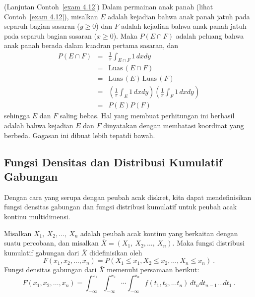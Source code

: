 \begin{example}(Lanjutan Contoh~\ref{exam 4.12}){\label{exam 4.15}}
Dalam permainan anak panah (lihat Contoh~\ref{exam 4.12}), misalkan $E$ adalah kejadian bahwa
anak panah jatuh pada separuh bagian  sasaran ($y \geq 0$) dan $F$ adalah
kejadian bahwa anak panah jatuh pada separuh bagian  sasaran ($x \geq
0$).  Maka $P(E \cap F)$ adalah peluang bahwa anak panah berada dalam kuadran pertama
sasaran, dan
\begin{eqnarray*}
P(E \cap F) & = & \frac 1\pi \int_{E \cap F} 1\,dxdy \\
            & = & \mbox{Luas}\,(E\cap F)         \\
            & = & \mbox{Luas}\,(E)\,\mbox{Luas}\,(F)  \\
            & = & \left(\frac 1\pi \int_E 1\,dxdy\right) \left(\frac 1\pi \int_F
1\,dxdy\right) \\
            & = & P(E)P(F)
\end{eqnarray*}
sehingga $E$ dan $F$ saling bebas.  Hal yang membuat perhitungan ini berhasil adalah bahwa kejadian
$E$ dan $F$ dinyatakan dengan membatasi koordinat yang berbeda.  Gagasan ini dibuat 
lebih tepat\linebreak[4] di bawah.
\end{example}

\subsection*{Fungsi Densitas dan Distribusi Kumulatif Gabungan}

Dengan cara yang serupa dengan peubah acak diskret, kita dapat mendefinisikan fungsi densitas
gabungan dan fungsi distribusi kumulatif untuk peubah acak kontinu multidimensi.  

\begin{definition}\label{def 4.5}
Misalkan $X_1,~X_2, \ldots,~X_n$ adalah peubah acak kontinu yang berkaitan dengan suatu percobaan, dan
misalkan ${\bar X} = (X_1,~X_2, \ldots,~X_n)$.  Maka fungsi distribusi kumulatif
gabungan dari
${\bar X}$ didefinisikan oleh
$$F(x_1, x_2, \ldots, x_n) = P(X_1 \le x_1, X_2 \le x_2, \ldots, X_n \le x_n)\ .$$
Fungsi densitas gabungan dari
${\bar X}$ memenuhi persamaan berikut:
$$F(x_1, x_2, \ldots, x_n) = \int_{-\infty}^{x_1} \int_{-\infty}^{x_2} \cdots
\int_{-\infty}^{x_n} f(t_1, t_2, \ldots t_n)\,dt_ndt_{n-1}\ldots dt_1\ .$$
\end{definition}

